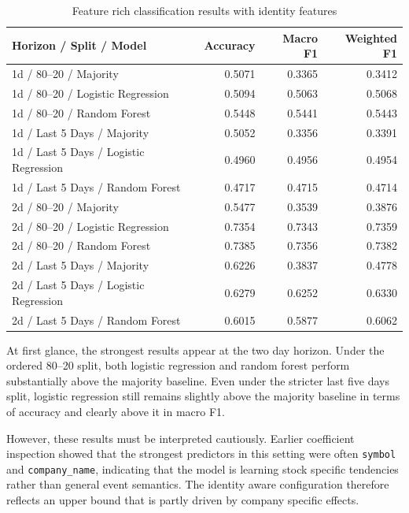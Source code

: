 \begin{table}[htbp]
\centering
\caption{Feature rich classification results with identity features}
\label{tab:cls_with_identity}
\begin{tabular}{llrrr}
\hline
\textbf{Horizon / Split / Model} & \textbf{} & \textbf{Accuracy} & \textbf{Macro F1} & \textbf{Weighted F1} \\
\hline
1d / 80--20 / Majority &  & 0.5071 & 0.3365 & 0.3412 \\
1d / 80--20 / Logistic Regression &  & 0.5094 & 0.5063 & 0.5068 \\
1d / 80--20 / Random Forest &  & 0.5448 & 0.5441 & 0.5443 \\
\hline
1d / Last 5 Days / Majority &  & 0.5052 & 0.3356 & 0.3391 \\
1d / Last 5 Days / Logistic Regression &  & 0.4960 & 0.4956 & 0.4954 \\
1d / Last 5 Days / Random Forest &  & 0.4717 & 0.4715 & 0.4714 \\
\hline
2d / 80--20 / Majority &  & 0.5477 & 0.3539 & 0.3876 \\
2d / 80--20 / Logistic Regression &  & 0.7354 & 0.7343 & 0.7359 \\
2d / 80--20 / Random Forest &  & 0.7385 & 0.7356 & 0.7382 \\
\hline
2d / Last 5 Days / Majority &  & 0.6226 & 0.3837 & 0.4778 \\
2d / Last 5 Days / Logistic Regression &  & 0.6279 & 0.6252 & 0.6330 \\
2d / Last 5 Days / Random Forest &  & 0.6015 & 0.5877 & 0.6062 \\
\hline
\end{tabular}
\end{table}

At first glance, the strongest results appear at the two day horizon. Under the ordered 80--20 split, both logistic regression and random forest perform substantially above the majority baseline. Even under the stricter last five days split, logistic regression still remains slightly above the majority baseline in terms of accuracy and clearly above it in macro F1.

However, these results must be interpreted cautiously. Earlier coefficient inspection showed that the strongest predictors in this setting were often \texttt{symbol} and \texttt{company\_name}, indicating that the model is learning stock specific tendencies rather than general event semantics. The identity aware configuration therefore reflects an upper bound that is partly driven by company specific effects.

